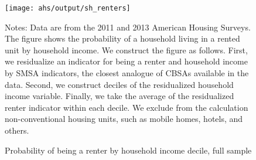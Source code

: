 \begin{figure}[h!]
    \centering
    \caption{Probability of being a renter by household income decile,
             full sample}
    \label{fig:ahs_pr_renters}

    \texttt{[image: ahs/output/sh\_renters]}

    \begin{minipage}{.95\textwidth} \footnotesize
        \vspace{3mm}
        Notes: Data are from the 2011 and 2013 American Housing Surveys.
        The figure shows the probability of a household living in a
        rented unit by household income. 
        We construct the figure as follows.
        First, we residualize an indicator for being a renter and 
        household income by SMSA indicators, the closest analogue of CBSAs 
        available in the data.
        Second, we construct deciles of the residualized household
        income variable.
        Finally, we take the average of the residualized renter 
        indicator within each decile.
        We exclude from the calculation non-conventional housing units, 
        such as mobile homes, hotels, and others.
    \end{minipage}
\end{figure}
